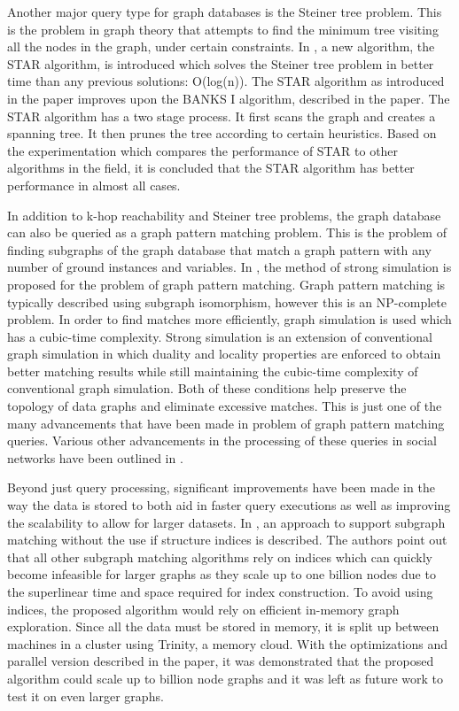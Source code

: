 \documentclass[11pt]{article}
\begin{document}
	Another major query type for graph databases is the Steiner tree problem.  This is the problem in graph theory that attempts to find the minimum tree visiting all the nodes in the graph, under certain constraints. In \cite{Star}, a new algorithm, the STAR algorithm, is introduced which solves the Steiner tree problem in better time than any previous solutions: O(log(n)).  The STAR algorithm as introduced in the paper improves upon the BANKS I algorithm, described in the paper. The STAR algorithm has a two stage process. It first scans the graph and creates a spanning tree. It then prunes the tree according to certain heuristics. Based on the experimentation which compares the performance of STAR to other algorithms in the field, it is concluded that the STAR algorithm has better performance in almost all cases.

	In addition to k-hop reachability and Steiner tree problems, the graph database can also be queried as a graph pattern matching problem.  This is the problem of finding subgraphs of the graph database that match a graph pattern with any number of ground instances and variables.  In \cite{Ma}, the method of strong simulation is proposed for the problem of graph pattern matching.  Graph pattern matching is typically described using subgraph isomorphism, however this is an NP-complete problem.  In order to find matches more efficiently, graph simulation is used which has a cubic-time complexity.  Strong simulation is an extension of conventional graph simulation in which duality and locality properties are enforced to obtain better matching results while still maintaining the cubic-time complexity of conventional graph simulation.  Both of these conditions help preserve the topology of data graphs and eliminate excessive matches.  This is just one of the many advancements that have been made in problem of graph pattern matching queries.  Various other advancements in the processing of these queries in social networks have been outlined in \cite{Fan}.

	Beyond just query processing, significant improvements have been made in the way the data is stored to both aid in faster query executions as well as improving the scalability to allow for larger datasets.  In \cite{Sun}, an approach to support subgraph matching without the use if structure indices is described.  The authors point out that all other subgraph matching algorithms rely on indices which can quickly become infeasible for larger graphs as they scale up to one billion nodes due to the superlinear time and space required for index construction.  To avoid using indices, the proposed algorithm would rely on efficient in-memory graph exploration.  Since all the data must be stored in memory, it is split up between machines in a cluster using Trinity, a memory cloud.  With the optimizations and parallel version described in the paper, it was demonstrated that the proposed algorithm could scale up to billion node graphs and it was left as future work to test it on even larger graphs.
\end{document}
